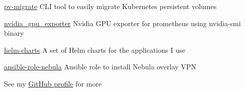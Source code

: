 
\begin{cvskills}

    \cvskill
    {\href{https://github.com/utkuozdemir/pv-migrate}{pv-migrate}}
    {CLI tool to easily migrate Kubernetes persistent volumes}

    \cvskill
    {\href{https://github.com/utkuozdemir/nvidia_gpu_exporter}{nvidia\_gpu\_exporter}}
    {Nvidia GPU exporter for prometheus using nvidia-smi binary}

    \cvskill
    {\href{https://github.com/utkuozdemir/helm-charts}{helm-charts}}
    {A set of Helm charts for the applications I use}

    \cvskill
    {\href{https://github.com/utkuozdemir/ansible-role-nebula}{ansible-role-nebula}}
    {Ansible role to install Nebula overlay VPN}

    \cvskill
    {}
    {See my \href{https://github.com/utkuozdemir}{GitHub profile} for more}

\end{cvskills}
